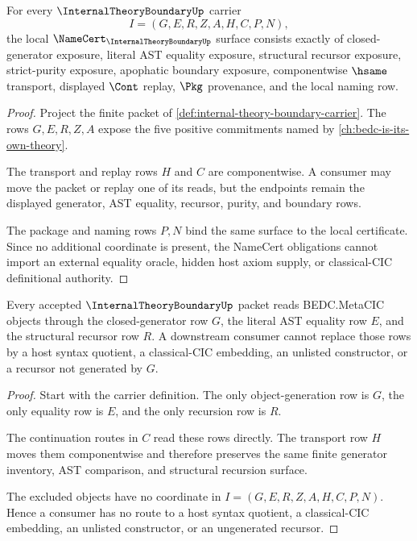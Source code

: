 \begin{theorem}
\label{thm:internal-theory-boundary-namecert-obligations}
For every $\InternalTheoryBoundaryUp$ carrier
$$
I=(G,E,R,Z,A,H,C,P,N),
$$
the local $\NameCert_{\InternalTheoryBoundaryUp}$ surface consists exactly of closed-generator exposure, literal AST equality exposure, structural recursor exposure, strict-purity exposure, apophatic boundary exposure, componentwise $\hsame$ transport, displayed $\Cont$ replay, $\Pkg$ provenance, and the local naming row.
\end{theorem}
\begin{proof}
Project the finite packet of \autoref{def:internal-theory-boundary-carrier}. The rows $G,E,R,Z,A$ expose the five positive commitments named by \autoref{ch:bedc-is-its-own-theory}.

The transport and replay rows $H$ and $C$ are componentwise. A consumer may move the packet or replay one of its reads, but the endpoints remain the displayed generator, AST equality, recursor, purity, and boundary rows.

The package and naming rows $P,N$ bind the same surface to the local certificate. Since no additional coordinate is present, the NameCert obligations cannot import an external equality oracle, hidden host axiom supply, or classical-CIC definitional authority.
\end{proof}

\begin{theorem}
\label{thm:internal-theory-boundary-closed-generator-nonescape}
Every accepted $\InternalTheoryBoundaryUp$ packet reads BEDC.MetaCIC objects through the closed-generator row $G$, the literal AST equality row $E$, and the structural recursor row $R$. A downstream consumer cannot replace those rows by a host syntax quotient, a classical-CIC embedding, an unlisted constructor, or a recursor not generated by $G$.
\end{theorem}
\begin{proof}
Start with the carrier definition. The only object-generation row is $G$, the only equality row is $E$, and the only recursion row is $R$.

The continuation routes in $C$ read these rows directly. The transport row $H$ moves them componentwise and therefore preserves the same finite generator inventory, AST comparison, and structural recursion surface.

The excluded objects have no coordinate in $I=(G,E,R,Z,A,H,C,P,N)$. Hence a consumer has no route to a host syntax quotient, a classical-CIC embedding, an unlisted constructor, or an ungenerated recursor.
\end{proof}

